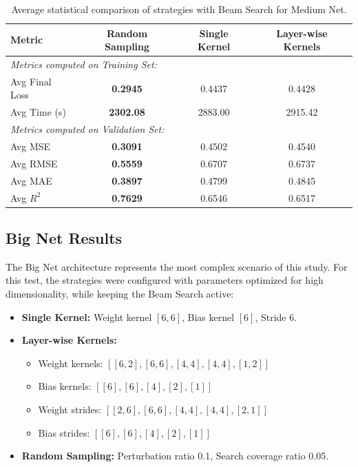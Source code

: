 \begin{table}[h]
\centering
\scriptsize
\begin{tabular}{|l|c|c|c|}
\hline
\textbf{Metric} & \textbf{Random Sampling} & \textbf{Single Kernel} & \textbf{Layer-wise Kernels} \\ \hline
\multicolumn{4}{|l|}{\textit{Metrics computed on Training Set:}} \\ \hline
Avg Final Loss        & \textbf{0.2945}               & 0.4437                 & 0.4428                      \\ \hline
Avg Time (s)          & \textbf{2302.08}              & 2883.00                & 2915.42                     \\ \hline
\multicolumn{4}{|l|}{\textit{Metrics computed on Validation Set:}} \\ \hline
Avg MSE               & \textbf{0.3091}               & 0.4502                 & 0.4540                      \\ \hline
Avg RMSE              & \textbf{0.5559}               & 0.6707                 & 0.6737                      \\ \hline
Avg MAE               & \textbf{0.3897}               & 0.4799                 & 0.4845                      \\ \hline
Avg $R^2$             & \textbf{0.7629}               & 0.6546                 & 0.6517                      \\ \hline
\end{tabular}
\caption{Average statistical comparison of strategies with Beam Search for Medium Net.}
\label{tab:medium_net_comp_bs_results}
\end{table}


\newpage

\subsection{Big Net Results}

The Big Net architecture represents the most complex scenario of this study. For this test, the strategies were configured with parameters optimized for high dimensionality, while keeping the Beam Search active:

\begin{itemize}
    \item \textbf{Single Kernel:} Weight kernel $[6,6]$, Bias kernel $[6]$, Stride 6.
    \item \textbf{Layer-wise Kernels:} 
        \begin{itemize}
            \item Weight kernels: $[[6,2], [6,6], [4,4], [4,4], [1,2]]$
            \item Bias kernels: $[[6], [6], [4], [2], [1]]$
            \item Weight strides: $[[2,6], [6,6], [4,4], [4,4], [2,1]]$
            \item Bias strides: $[[6], [6], [4], [2], [1]]$
        \end{itemize}
    \item \textbf{Random Sampling:} Perturbation ratio 0.1, Search coverage ratio 0.05.
\end{itemize}


